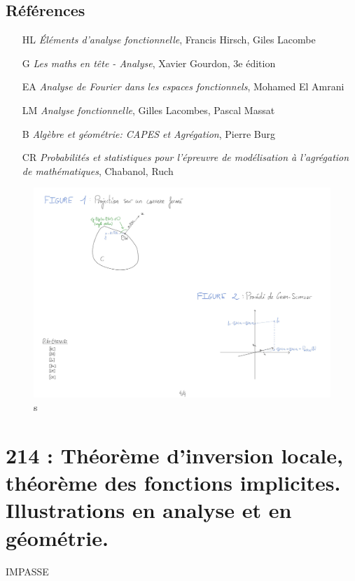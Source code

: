 \documentclass[10pt, a4paper, parskip=full, twoside, twocolumn]{report}
\begin{document}
\section*{Références}
\begin{itemize}
	\item[HL] \emph{Éléments d'analyse fonctionnelle}, Francis Hirsch, Giles Lacombe
	\item[G] \emph{Les maths en tête - Analyse}, Xavier Gourdon, 3e édition 
	\item[EA] \emph{Analyse de Fourier dans les espaces fonctionnels}, Mohamed El Amrani
	\item[LM] \emph{Analyse fonctionnelle}, Gilles Lacombes, Pascal Massat
	\item[B] \emph{Algèbre et géométrie: CAPES et Agrégation}, Pierre Burg
	\item[CR] \emph{Probabilités et statistiques pour l'épreuvre de modélisation à l'agrégation de mathématiques}, Chabanol, Ruch
\end{itemize}
\begin{figure}[!htb]
	\centering
	\includegraphics[trim={0 0 0 0},clip,width=1\linewidth]{img/213.pdf}
	\caption{s}
\end{figure}

\chapter*{214 : Théorème d’inversion locale, théorème des fonctions implicites. Illustrations en analyse et en géométrie.}
\textcolor{paragraphtext}{IMPASSE}
\end{document}
